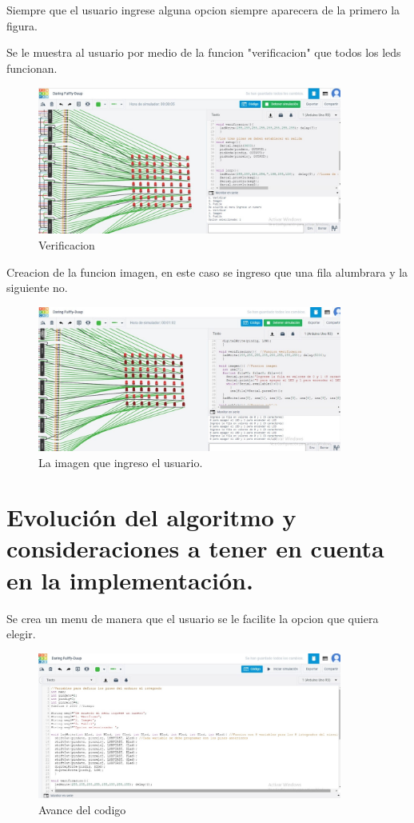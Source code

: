 \documentclass{article}
\begin{document}
Siempre que el usuario ingrese alguna opcion siempre aparecera de la primero la figura.

\newpage

Se le muestra al usuario por medio de la funcion "verificacion" que todos los leds funcionan.

\begin{figure}[h]
\includegraphics[width=10cm]{Verificacion.jpeg}
\centering

\caption{Verificacion}
\label{fig:Verificacion}
\end{figure}

Creacion de la funcion imagen, en este caso se ingreso que una fila alumbrara y la siguiente no.
\begin{figure}[h]
\includegraphics[width=10cm]{Avance 3.jpeg}
\centering
\caption{La imagen que ingreso el usuario.}
\label{fig:Avance 3}
\end{figure}





\newpage
\section{Evolución del algoritmo y consideraciones a tener en cuenta en la implementación.}\label{intro}
Se crea un menu de manera que el usuario se le facilite la opcion que quiera elegir.

\begin{figure}[h]
\includegraphics[width=10cm]{Avance 1.jpeg}
\centering
\caption{Avance del codigo}
\label{fig:Avance 1}
\end{figure}
\end{document}
